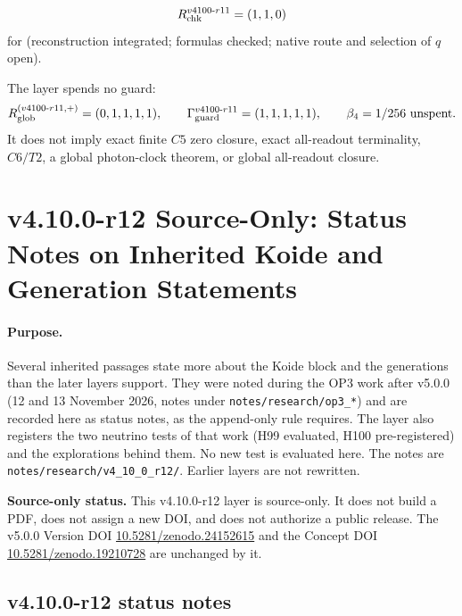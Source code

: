 \[
R_{\rm chk}^{v4100\text{-}r11}=(1,1,0)
\]
for (reconstruction integrated; formulas checked; native route and selection of \(q\) open).

The layer spends no guard:
\[
R_{\rm glob}^{(v4100\text{-}r11,+)}=(0,1,1,1,1),
\qquad
\Gamma_{\rm guard}^{v4100\text{-}r11}=(1,1,1,1,1),
\qquad
\beta_4=1/256\ \text{unspent}.
\]
It does not imply exact finite \(C5\) zero closure, exact all-readout terminality,
\(C6/T2\), a global photon-clock theorem, or global all-readout closure.

\clearpage
\section*{v4.10.0-r12 Source-Only: Status Notes on Inherited Koide and Generation Statements}
\label{sec:v4100-r12-status-notes}

\paragraph{Purpose.}
Several inherited passages state more about the Koide block and the generations than the later layers support.  They were
noted during the OP3 work after v5.0.0 (12 and 13 November 2026, notes under \texttt{notes/\allowbreak research/\allowbreak op3\_*}) and
are recorded here as status notes, as the append-only rule requires.  The layer also registers the two neutrino tests of
that work (H99 evaluated, H100 pre-registered) and the explorations behind them.  No new test is evaluated here.  The notes
are \texttt{notes/\allowbreak research/\allowbreak v4\_10\_0\_r12/}.  Earlier layers are not rewritten.

\noindent\textbf{Source-only status.}
This v4.10.0-r12 layer is source-only.  It does not build a PDF, does not assign a new DOI,
and does not authorize a public release.  The v5.0.0 Version DOI
\href{https://doi.org/10.5281/zenodo.24152615}{10.5281/zenodo.24152615} and the Concept DOI
\href{https://doi.org/10.5281/zenodo.19210728}{10.5281/zenodo.19210728} are unchanged by it.

\subsection*{v4.10.0-r12 status notes}
\label{subsec:v4100-r12-status}

